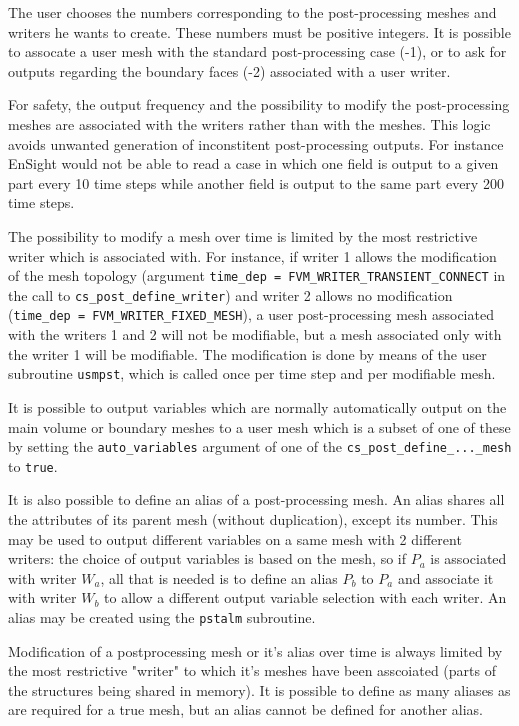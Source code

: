{{{The user chooses the numbers corresponding to the post-processing
meshes and writers he wants to create. These numbers must be positive
integers. It is possible to assocate a user mesh with the standard
post-processing case (-1), or to ask for outputs regarding the boundary
faces (-2) associated with a user writer.

For safety, the output frequency and the possibility to modify the
post-processing meshes are associated with the writers rather than
with the meshes. This logic avoids unwanted generation of
inconstitent post-processing outputs. For instance EnSight would not
be able to read a case in which one field is output to a given part
every 10 time steps while another field is output to the same part
every 200 time steps.

The possibility to modify a mesh over time is limited by the most restrictive
writer which is associated with. For instance, if writer
1 allows the modification of the mesh topology (argument \texttt{time\_dep
= FVM\_WRITER\_TRANSIENT\_CONNECT} in the call to \texttt{cs\_post\_define\_writer}) and writer 2 allows no
modification (\texttt{time\_dep = FVM\_WRITER\_FIXED\_MESH}),
a user post-processing mesh
associated with the writers 1 and 2 will not be modifiable, but a
mesh associated only with the writer 1 will be modifiable. The
modification is done by means of the user subroutine \texttt{usmpst},
which is called once per time step and per modifiable mesh.

It is possible to output variables which are normally automatically
output on the main volume or boundary meshes to a user mesh which is a subset
of one of these by setting the \texttt{auto\_variables} argument of
one of the \texttt{cs\_post\_define\_...\_mesh} to \texttt{true}.

It is also possible to define an alias of a post-processing mesh. An
alias shares all the attributes of its parent mesh (without duplication),
except its number. This may be used to output different variables on a
same mesh with 2 different writers: the choice of output variables
is based on the mesh, so if $P_a$ is associated with writer $W_a$,
all that is needed is to define an alias $P_b$ to $P_a$ and associate
it with writer $W_b$ to allow a different output variable selection with
each writer. An alias may be created using the \texttt{pstalm} subroutine.

Modification of a postprocessing mesh or it's alias over time is always
limited by the most restrictive "writer" to which it's meshes have been
asscoiated (parts of the structures being shared in memory). It is
possible to define as many aliases as are required for a true mesh,
but an alias cannot be defined for another alias.

}}}
